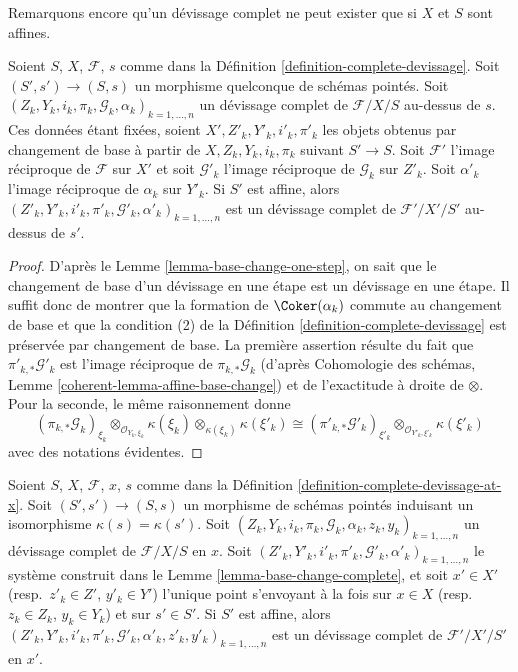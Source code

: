 \noindent
Remarquons encore qu'un d\'evissage complet ne peut exister que si $X$ et
$S$ sont affines.

\begin{lemma}
\label{lemma-base-change-complete}
Soient $S$, $X$, $\mathcal{F}$, $s$ comme dans la
Définition \ref{definition-complete-devissage}.
Soit $(S', s') \to (S, s)$ un morphisme quelconque de schémas pointés.
Soit $(Z_k, Y_k, i_k, \pi_k, \mathcal{G}_k, \alpha_k)_{k = 1, \ldots, n}$
un d\'evissage complet de $\mathcal{F}/X/S$ au-dessus de $s$.
Ces données étant fixées, soient $X', Z'_k, Y'_k, i'_k, \pi'_k$ les objets obtenus par changement
de base à partir de $X, Z_k, Y_k, i_k, \pi_k$ suivant $S' \to S$.
Soit $\mathcal{F}'$ l'image réciproque de $\mathcal{F}$ sur $X'$
et soit $\mathcal{G}'_k$ l'image réciproque de $\mathcal{G}_k$ sur $Z'_k$.
Soit $\alpha'_k$ l'image réciproque de $\alpha_k$ sur $Y'_k$.
Si $S'$ est affine, alors
$(Z'_k, Y'_k, i'_k, \pi'_k, \mathcal{G}'_k, \alpha'_k)_{k = 1, \ldots, n}$
est un d\'evissage complet de $\mathcal{F}'/X'/S'$ au-dessus de $s'$.
\end{lemma}

\begin{proof}
D'après le
Lemme \ref{lemma-base-change-one-step},
on sait que le changement de base d'un d\'evissage en une étape est un
d\'evissage en une étape. Il suffit donc de montrer que la formation de
$\Coker(\alpha_k)$ commute au changement de base et que la
condition (2) de la
Définition \ref{definition-complete-devissage}
est préservée par changement de base. La première assertion résulte du fait que
$\pi'_{k, *}\mathcal{G}'_k$ est l'image réciproque de
$\pi_{k, *}\mathcal{G}_k$ (d'après
Cohomologie des schémas, Lemme \ref{coherent-lemma-affine-base-change})
et de l'exactitude à droite de $\otimes$. Pour la seconde,
le même raisonnement donne
$$
(\pi_{k, *}\mathcal{G}_k)_{\xi_k}
\otimes_{\mathcal{O}_{Y_k, \xi_k}} \kappa(\xi_k)
\otimes_{\kappa(\xi_k)} \kappa(\xi'_k)
\cong
(\pi'_{k, *}\mathcal{G}'_k)_{\xi'_k}
\otimes_{\mathcal{O}_{Y'_k, \xi'_k}} \kappa(\xi'_k)
$$
avec des notations évidentes.
\end{proof}

\begin{lemma}
\label{lemma-base-change-complete-at-x}
Soient $S$, $X$, $\mathcal{F}$, $x$, $s$ comme dans la
Définition \ref{definition-complete-devissage-at-x}.
Soit $(S', s') \to (S, s)$ un morphisme de schémas pointés
induisant un isomorphisme $\kappa(s) = \kappa(s')$. Soit
$(Z_k, Y_k, i_k, \pi_k, \mathcal{G}_k, \alpha_k, z_k, y_k)_{k = 1, \ldots, n}$
un d\'evissage complet de $\mathcal{F}/X/S$ en $x$.
Soit
$(Z'_k, Y'_k, i'_k, \pi'_k, \mathcal{G}'_k, \alpha'_k)_{k = 1, \ldots, n}$
le système construit dans le
Lemme \ref{lemma-base-change-complete},
et soit $x' \in X'$ (resp.\ $z'_k \in Z'$, $y'_k \in Y'$) l'unique
point s'envoyant à la fois sur $x \in X$ (resp.\ $z_k \in Z_k$, $y_k \in Y_k$)
et sur $s' \in S'$.
Si $S'$ est affine, alors
$(Z'_k, Y'_k, i'_k, \pi'_k, \mathcal{G}'_k, \alpha'_k,
z'_k, y'_k)_{k = 1, \ldots, n}$
est un d\'evissage complet de $\mathcal{F}'/X'/S'$ en $x'$.
\end{lemma}

